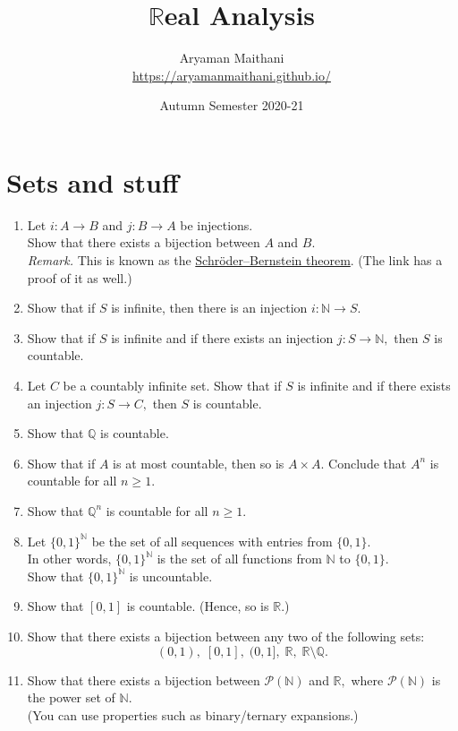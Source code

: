 \documentclass[12pt]{article}
\title{$\mathbb{R}$eal Analysis}
\author{Aryaman Maithani\\\url{https://aryamanmaithani.github.io/}}
\date{Autumn Semester 2020-21}
\theoremstyle{definition}
\numberwithin{thm}{section}
\begin{document}
\maketitle
\tableofcontents
\newpage\section{Sets and stuff}
\begin{enumerate}
	\item Let $i:A \to B$ and $j:B\to A$ be injections.\\
	Show that there exists a bijection between $A$ and $B.$\\
	\emph{Remark.} This is known as the \href{https://en.wikipedia.org/wiki/Schr%C3%B6der%E2%80%93Bernstein_theorem}{Schröder–Bernstein theorem}. (The link has a proof of it as well.)
	\item Show that if $S$ is infinite, then there is an injection $i:\mathbb{N} \to S.$
	\item Show that if $S$ is infinite and if there exists an injection $j:S \to \mathbb{N},$ then $S$ is countable.
	\item Let $C$ be a countably infinite set. Show that if $S$ is infinite and if there exists an injection $j:S \to C,$ then $S$ is countable.
	\item Show that $\mathbb{Q}$ is countable.
	\item Show that if $A$ is at most countable, then so is $A \times A.$ Conclude that $A^n$ is countable for all $n \ge 1.$
	\item Show that $\mathbb{Q}^n$ is countable for all $n \ge 1.$
	\item Let $\{0, 1\}^\mathbb{N}$ be the set of all sequences with entries from $\{0, 1\}.$\\
	In other words, $\{0, 1\}^\mathbb{N}$ is the set of all functions from $\mathbb{N}$ to $\{0, 1\}.$\\
	Show that $\{0, 1\}^\mathbb{N}$ is uncountable.
	\item Show that $[0, 1]$ is countable. (Hence, so is $\mathbb{R}.$)
	\item Show that there exists a bijection between any two of the following sets: 
	\begin{equation*} 
		(0, 1),\; [0, 1],\; (0, 1],\; \mathbb{R},\; \mathbb{R}\setminus\mathbb{Q}.
	\end{equation*}
	\item Show that there exists a bijection between $\mathcal{P}(\mathbb{N})$ and $\mathbb{R},$ where $\mathcal{P}(\mathbb{N})$ is the power set of $\mathbb{N}.$\\
	(You can use properties such as binary/ternary expansions.)
\end{enumerate}
\end{document}
